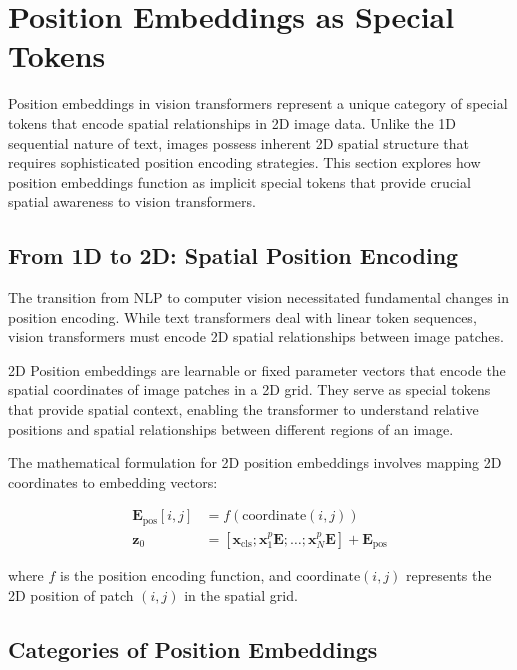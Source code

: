 
\section{Position Embeddings as Special Tokens}

Position embeddings in vision transformers represent a unique category of special tokens that encode spatial relationships in 2D image data. Unlike the 1D sequential nature of text, images possess inherent 2D spatial structure that requires sophisticated position encoding strategies. This section explores how position embeddings function as implicit special tokens that provide crucial spatial awareness to vision transformers.

\subsection{From 1D to 2D: Spatial Position Encoding}

The transition from NLP to computer vision necessitated fundamental changes in position encoding. While text transformers deal with linear token sequences, vision transformers must encode 2D spatial relationships between image patches.

\begin{definition}
2D Position embeddings are learnable or fixed parameter vectors that encode the spatial coordinates of image patches in a 2D grid. They serve as special tokens that provide spatial context, enabling the transformer to understand relative positions and spatial relationships between different regions of an image.
\end{definition}

The mathematical formulation for 2D position embeddings involves mapping 2D coordinates to embedding vectors:

\begin{align}
\mathbf{E}_{\text{pos}}[i,j] &= f(\text{coordinate}(i,j)) \\
\mathbf{z}_0 &= [\mathbf{x}_{\text{cls}}; \mathbf{x}_1^p\mathbf{E}; \ldots; \mathbf{x}_N^p\mathbf{E}] + \mathbf{E}_{\text{pos}}
\end{align}

where $f$ is the position encoding function, and $\text{coordinate}(i,j)$ represents the 2D position of patch $(i,j)$ in the spatial grid.

\subsection{Categories of Position Embeddings}

